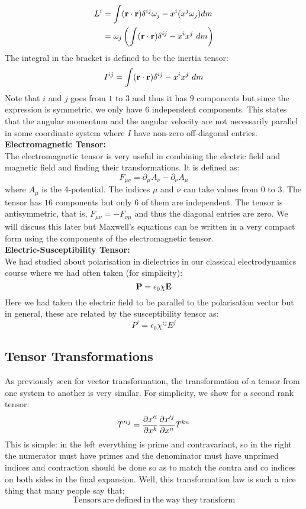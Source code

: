 \begin{align*}
    L^i &= \int (\veb{r}\cdot \veb{r})\tensor*{\delta}{^i^j}\omega_j - x^i(x^j\omega_j)dm\\
    &= \omega_j \brac{\int (\veb{r}\cdot \veb{r})\tensor*{\delta}{^i^j} - x^ix^j\ dm} 
\end{align*}
The integral in the bracket is defined to be the inertia tensor:
$$I^{ij} = \int (\veb{r}\cdot \veb{r})\tensor*{\delta}{^i^j} - x^ix^j \ dm$$
Note that $i$ and $j$ goes from $1$ to $3$ and thus it has $9$ components but since the expression is symmetric, we only have $6$ independent components. This states that the angular momentum and the angular velocity are not necessarily parallel in some coordinate system where $I$ have non-zero off-diagonal entries.\\[0.3cm]
\textbf{Electromagnetic Tensor:}\\[0.3cm]
The electromagnetic tensor is very useful in combining the electric field and magnetic field and finding their transformations. It is defined as:
$$F_{\mu\nu} = \partial_\mu A_\nu - \partial_\nu A_\mu$$
where $A_\mu$ is the 4-potential. The indices $\mu$ and $\nu$ can take values from $0$ to $3$. The tensor has $16$ components but only $6$ of them are independent. The tensor is antisymmetric, that is, $F_{\mu\nu} = -F_{\nu\mu}$ and thus the diagonal entries are zero. We will discuss this later but Maxwell's equations can be written in a very compact form using the components of the electromagnetic tensor.\\[0.3cm]
\textbf{Electric-Susceptibility Tensor:}\\[0.3cm]
We had studied about polarisation in dielectrics in our classical electrodynamics course where we had often taken (for simplicity):
$$\boldsymbol{\mathbf{P}} = \epsilon_0\chi\boldsymbol{\mathbf{E}}$$
Here we had taken the electric field to be parallel to the polarisation vector but in general, these are related by the susceptibility tensor as:
$$P^i = \epsilon_0\chi^{ij}E^{j}$$
\subsection{Tensor Transformations}
As previously seen for vector transformation, the transformation of a tensor from one system to another is very similar. For simplicity, we show for a second rank tensor:
$$\tensor{T }{^{\prime ij}} = \pdv{x^{\prime i}}{x^k} \pdv{x^{\prime j}}{x^n} \tensor{T}{^{kn}}$$
This is simple: in the left everything is prime and contravariant, so in the right the numerator must have primes and the denominator must have unprimed indices and contraction should be done so as to match the contra and co indices on both sides in the final expansion. Well, this transformation law is such a nice thing that many people say that: 
$$\boxed{\mathrm{Tensors\ are \ defined\ in\ the\ way\ they\ transform}}$$

